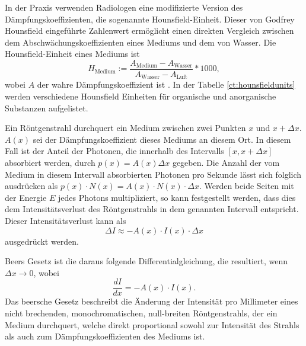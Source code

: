 In der Praxis verwenden Radiologen eine modifizierte Version des Dämpfungskoeffizienten, die sogenannte Hounsfield-Einheit. Dieser von Godfrey Hounsfield eingeführte Zahlenwert ermöglicht einen direkten Vergleich zwischen dem Abschwächungskoeffizienten eines Mediums und dem von Wasser. Die Hounsfield-Einheit eines Mediums ist
\begin{equation}
	H_{\text{Medium}} := \dfrac{A_{\text{Medium}}-A_{\text{Wasser}}}{A_{\text{Wasser}} - A_{\text{Luft}}} * 1000,
\end{equation}
wobei $A$ der wahre Dämpfungskoeffizient ist \cite{doccheck_hounsfield-skala_nodate}. In der Tabelle \ref{ct:hounsfieldunits} werden verschiedene Hounsfield Einheiten für organische und anorganische Substanzen aufgelistet.

Ein Röntgenstrahl durchquert ein Medium zwischen zwei Punkten $x$ und $x + \Delta x$. $A(x)$ sei der Dämpfungskoeffizient dieses Mediums an diesem Ort. In diesem Fall ist der Anteil der Photonen, die innerhalb des Intervalls $[x, x + \Delta x]$ absorbiert werden, durch $p(x) = A(x)\Delta x$ gegeben. Die Anzahl der vom Medium in diesem Intervall absorbierten Photonen pro Sekunde lässt sich folglich ausdrücken als $p(x) \cdot N(x) = A(x) \cdot N(x) \cdot \Delta x$. Werden beide Seiten mit der Energie $E$ jedes Photons multipliziert, so kann festgestellt werden, dass dies dem Intensitätsverlust des Röntgenstrahls in dem genannten Intervall entspricht. Dieser Intensitätsverlust kann als 
\begin{equation}
	\Delta I \approx -A(x) \cdot I(x) \cdot \Delta x
\end{equation}
ausgedrückt werden.

Beers Gesetz ist die daraus folgende Differentialgleichung, die resultiert, wenn $\Delta x \rightarrow 0$, wobei 
\begin{equation}
	\dfrac{dI}{dx} = -A(x)\cdot I(x).
\end{equation}
Das beersche Gesetz beschreibt die Änderung der Intensität pro Millimeter eines nicht brechenden, monochromatischen, null-breiten Röntgenstrahls, der ein Medium durchquert, welche direkt proportional sowohl zur Intensität des Strahls als auch zum Dämpfungskoeffizienten des Mediums ist.

